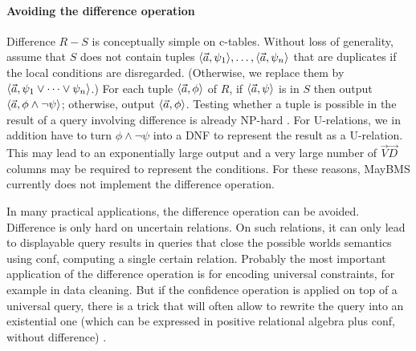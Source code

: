 


\paragraph{Avoiding the difference operation}
%
Difference $R-S$ is conceptually simple on c-tables.
Without loss of generality, assume that $S$ does not contain tuples
$\langle \vec{a}, \psi_1 \rangle, \dots, \langle \vec{a}, \psi_n \rangle$ that are duplicates if the local conditions are disregarded. (Otherwise, we replace them
by $\langle \vec{a}, \psi_1 \lor \dots \lor \psi_n \rangle$.)
For each tuple $\langle \vec{a}, \phi \rangle$ of $R$, if
$\langle \vec{a}, \psi \rangle$ is in $S$ then output
$\langle \vec{a}, \phi \land \neg \psi \rangle$; otherwise, output
$\langle \vec{a}, \phi \rangle$.
Testing whether a tuple is possible in the result of a query involving difference is already NP-hard \cite{AKG1991}. For U-relations, we in addition have to turn $\phi \land \neg \psi$
into a DNF to represent the result as a U-relation.
This may lead to an exponentially large output and a very large number of $\vec{V}\vec{D}$ columns may be required to represent the conditions.
For these reasons, MayBMS currently does not implement the difference operation.

In many practical applications, the difference operation can be avoided.
Difference is only hard on uncertain relations. On such relations, it can only lead to displayable query results in queries that close the possible worlds semantics using conf, computing a single certain relation.
%
Probably the most important application of the difference operation is for encoding universal constraints, for example in data cleaning.
But if the confidence operation is applied on top of a universal query, there is a trick that will often allow to rewrite the query into an
existential one  (which can be expressed in positive relational algebra plus conf,
without difference) \cite{Koch2008}.


